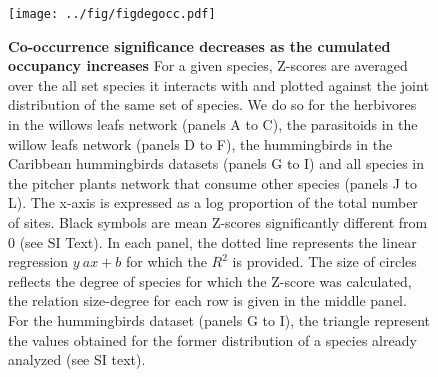 \begin{figure}[htbp]
\centering
\texttt{[image: ../fig/figdegocc.pdf]}
\caption{\textbf{Co-occurrence significance decreases as the cumulated
occupancy increases} For a given species, Z-scores are averaged over the
all set species it interacts with and plotted against the joint
distribution of the same set of species. We do so for the herbivores in
the willows leafs network (panels A to C), the parasitoids in the willow
leafs network (panels D to F), the hummingbirds in the Caribbean
hummingbirds datasets (panels G to I) and all species in the pitcher
plants network that consume other species (panels J to L). The x-axis is
expressed as a log proportion of the total number of sites. Black
symbols are mean Z-scores significantly different from 0 (see SI Text).
In each panel, the dotted line represents the linear regression
\(y~ax+b\) for which the \(R^2\) is provided. The size of circles
reflects the degree of species for which the Z-score was calculated, the
relation size-degree for each row is given in the middle panel. For the
hummingbirds dataset (panels G to I), the triangle represent the values
obtained for the former distribution of a species already analyzed (see
SI text).\label{fig:degocc}}
\end{figure}

\newpage
